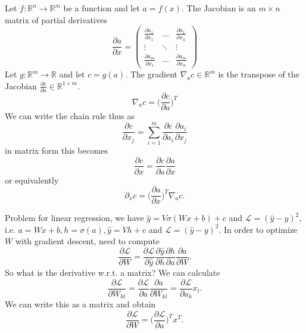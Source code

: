 \documentclass[12 pt]{article}        	%
\begin{document}
\begin{defi}
    Let $ f \colon \mathbb{ R }^n \to \mathbb{ R }^m $  be a function and let $ a = f ( x ) $. The Jacobian is an $ m \times n $ matrix of partial derivatives
    \[
        \frac{ \partial a }{ \partial x } 
        =
        \begin{pmatrix}
            \frac{ \partial a_1 }{ \partial x_1 }
            &
            \dotsc 
            &
            \frac{ \partial a_1 }{ \partial x_n }
            \\
            \vdots 
            &
            \ddots
            &
            \vdots
            \\
            \frac{ \partial a_m }{ \partial x_1 }
            &
            \dotsc 
            &
            \frac{ \partial a_m }{ \partial x_n }
        \end{pmatrix}
    \]
    Let $ g \colon \mathbb{ R }^m \to \mathbb{ R } $ and let $ c = g ( a ) $.
    The gradient $ \nabla_a c \in \mathbb{ R }^m $ is the transpose of the Jacobian 
    $ \frac{ \partial c }{ \partial a } \in \mathbb{ R }^{ 1 \times m } $.
    \[
        \nabla_a c
        =
        \bigg( \frac{ \partial c }{ \partial a } \bigg)^T 
    \]
    We can write the chain rule thus as
    \[
        \frac{ \partial c }{ \partial x_j } 
        = 
        \sum_{ i = 1 }^m \frac{ \partial c }{ \partial a_i } \frac{ \partial a_i }{ \partial x_j }
    \]
    in matrix form this becomes 
    \[
        \frac{ \partial c }{ \partial x } = \frac{ \partial c }{ \partial a } \frac{ \partial a }{ \partial x }
    \]
    or equivalently 
    \[
        \partial_x c 
        =
        \bigg( \frac{ \partial a }{ \partial x } \bigg)^T \nabla_a c.
    \]

    Problem for linear regression, we have $ \widehat{ y } = V \sigma ( Wx + b ) + c $ and $ \mathcal{ L } = ( \widehat{ y } - y )^2 $, i.e. $ a = Wx + b , h = \sigma ( a ) , \widehat{ y } = V h + c $ and $ \mathcal{ L } = ( \widehat{ y } - y )^2 $.
    In order to optimize $ W $ with gradient descent, need to compute 
    \[
        \frac{ \partial \mathcal{ L } }{ \partial W }
        =
        \frac{ \partial \mathcal{ L } }{ \partial \widehat{ y } } 
        \frac{ \partial \widehat{ y } }{ \partial h } 
        \frac{ \partial h }{ \partial a } 
        \frac{ \partial a }{ \partial W }.
    \]
    So what is the derivative w.r.t. a matrix?
    We can calculate
    \[
        \frac{ \partial \mathcal{ L } } { \partial W_{ kl } } 
        =
        \frac{ \partial{ \mathcal{ L } } }{ \partial a }
        \frac{ \partial a }{ \partial W_{ kl } }
        =
        \frac{ \partial \mathcal{ L } }{ \partial a_k } x_l.
    \]
    We can write this as a matrix and obtain
    \[
        \frac{ \partial \mathcal{ L } }{ \partial W }
        =
        \bigg( \frac{ \partial \mathcal{ L } }{ \partial a } \bigg)^T x^T.
    \]
\end{defi}
\end{document}
